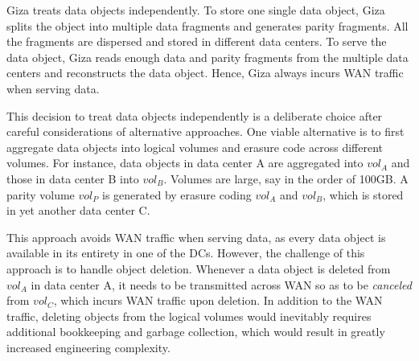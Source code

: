 
Giza treats data objects independently. To store one single data object, Giza splits the object into multiple data fragments and generates parity fragments. All the fragments are dispersed and stored in different data centers. To serve the data object, Giza reads enough data and parity fragments from the multiple data centers and reconstructs the data object. Hence, Giza always incurs WAN traffic when serving data.

This decision to treat data objects independently is a deliberate choice after careful considerations of alternative approaches. One viable alternative is to first aggregate data objects into logical volumes and erasure code across different volumes. For instance, data objects in data center A are aggregated into $vol_A$ and those in data center B into $vol_B$. Volumes are large, say in the order of 100GB. A parity volume $vol_P$ is generated by erasure coding $vol_A$ and $vol_B$, which is stored in yet another data center C.

This approach avoids WAN traffic when serving data, as every data object is available in its entirety in one of the DCs. However, the challenge of this approach is to handle object deletion. Whenever a data object is deleted from $vol_A$ in data center A, it needs to be transmitted across WAN so as to be {\em canceled} from $vol_C$, which incurs WAN traffic upon deletion. In addition to the WAN traffic, deleting objects from the logical volumes would inevitably requires additional bookkeeping and garbage collection, which would result in greatly increased engineering complexity.



